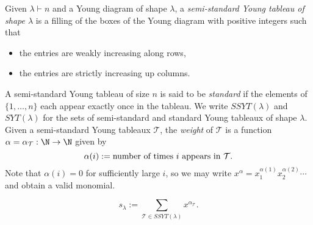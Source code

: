 \documentclass[12pt]{article}
\begin{document}
\begin{definition}\label{def:youngtableaux}
  Given $ \lambda\vdash n $ and a Young diagram of shape $ \lambda $, a \textit{semi-standard Young tableau of shape $ \lambda $} is a filling of the boxes of the Young diagram with positive integers such that 
  \begin{itemize}
    \item the entries are weakly increasing along rows,
    \item the entries are strictly increasing up columns.
  \end{itemize}
  A semi-standard Young tableau of size $ n $ is said to be \textit{standard} if the elements of $ \{1,\ldots,n\} $ each appear exactly once in the tableau. We write $ SSYT(\lambda) $ and $ SYT(\lambda) $ for the sets of semi-standard and standard Young tableaux of shape $ \lambda $. Given a semi-standard Young tableaux $ \mathcal{T} $, the \textit{weight} of $ \mathcal{T} $ is a function $ \alpha=\alpha_{\mathcal{T}}:\N \to \N$ given by
  \[
    \alpha(i) := \text{number of times $ i $ appears in $ \mathcal{T} $}.
  \]
  Note that $ \alpha(i) = 0 $ for sufficiently large $ i $, so we may write $ x^{\alpha} = x_{1}^{\alpha(1)}x_{2}^{\alpha(2)} \cdots $ and obtain a valid monomial.
\end{definition}


\begin{definition}\label{def:schur}
 \[
  s_{\lambda} := \sum_{\mathcal{T}\in SSYT(\lambda) } x^{\alpha_{\mathcal{T}}}.
\] 
\end{definition}
\end{document}
